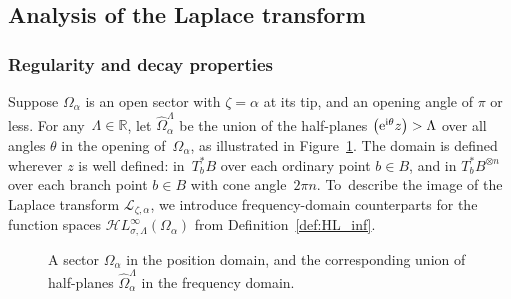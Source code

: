 \documentclass[10pt,a4paper]{amsart}
\let\Re\relax
\DeclareMathOperator{\Re}{Re}
\newcommand{\singexp}[2]{\mathcal{H}L^\infty_{#1, #2}}
\newcommand{\R}{\mathbb{R}}
\newcommand{\laplace}{\mathcal{L}}
\numberwithin{equation}{section}
\newcommand{\setfiberscale}[1]{
  \pgfmathsetmacro{\rfiber}{#1}
  \pgfmathsetmacro{\rshade}{1.5*\rfiber}
}
\newcommand{\drawfiber}{
  \foreach \sgn in {-1, 1} {
    \calligraphy[scale=\sgn, copperplate, heavy, heavy line width=0.25mm]
      (\rfiber, \rfiber) -- (\rfiber, -\rfiber)
      (\rfiber, -\rfiber) -- (-\rfiber, -\rfiber);
  }%
}
\newcommand{\fiberdescender}[1]{
  \calligraphy[copperplate, light, thin] (0, -\rfiber) -- (0, -#1);
}
\newcommand{\fibershading}[2]{
  \tikzmath{
    \shadestart = (-90 - #1) / \fiberdeg;
    \shadeend = (90 - #1) / \fiberdeg;
  }
  \fill[pwbeige!30, draw=pwbeige!60] (0, 0) ++(-#1:#2) -- ++(\shadestart:\rshade) arc (\shadestart:\shadeend:\rshade) -- cycle;
}
\newenvironment{fiber}[1][]{%
  \pgfkeys{/laplace/.cd, drop=0, shade=false, degree=1, phase=0, dis=0, #1}
  \begin{scope}
    \fill[surf] (-\rfiber, -\rfiber) rectangle (\rfiber, \rfiber);
    \clip (-\rfiber, -\rfiber) rectangle (\rfiber, \rfiber);
    \tikzmath{
      if \fibershade then {
        print \fibershading{\fiberphase}{\fiberdis};
      };
    }
}{%
  \end{scope}
  \tikzmath{
    if \fiberdrop > 0 then {
      print \fiberdescender{\fiberdrop};
    };
  }
  \drawfiber
}
\newcommand{\genfibercontent}[1][]{
  \pgfkeys{/laplace/.cd, dual=false, #1}
  \pgfmathsetmacro{\hatch}{\rfiber/8}%
  \pgfmathsetmacro{\firsthatch}{-\rfiber+\hatch}
  \pgfmathsetmacro{\nexthatch}{-\rfiber+2*\hatch}
  \pgfmathsetmacro{\hatchstop}{\rfiber-\hatch/2}
  \foreach \y in {\firsthatch, \nexthatch, ..., \hatchstop} {
    \tikzmath{
      coordinate \drawfrom;
      coordinate \drawto;
      if \fiberdual then {
        \drawfrom = (\y, -\rfiber);
        \drawto = (\y, \rfiber);
      } else {
        \drawfrom = (-\rfiber, \y);
        \drawto = (\rfiber, \y);
      };
    }
    \draw[leaf] (\drawfrom) -- (\drawto);
  }%
  \fill circle (\dotsize);
}
\begin{document}
\subsection{Analysis of the Laplace transform}\label{sec:laplace_analytic}
%
\subsubsection{Regularity and decay properties}\label{sec:reg-decay}
%
Suppose $\Omega_\alpha$ is an open sector with $\zeta = \alpha$ at its tip, and an opening angle of $\pi$ or less. For any~${\Lambda \in \R}$, let $\widehat{\Omega}_\alpha^\Lambda$ be the union of the half-planes $\Re\bigl({\rm e}^{{\rm i}\theta} z\bigr) > \Lambda$ over all angles $\theta$ in the opening of~$\Omega_\alpha$, as illustrated in Figure~\ref{fig:sectorial_domain-pos-fre}. The domain \smash{$\widehat{\Omega}_\alpha^\Lambda$} is defined wherever $z$ is well defined: in~$T_b^*B$ over each ordinary point $b \in B$, and in $T_b^*B^{\otimes n}$ over each branch point $b \in B$ with cone angle~$2\pi n$.
To~describe the image of the Laplace transform $\laplace_{\zeta,\alpha}$, we introduce frequency-domain counterparts for the function spaces $\singexp{\sigma}{\Lambda}(\Omega_\alpha)$ from Definition~\ref{def:HL_inf}.

\begin{figure}[!ht]\centering
{}
\caption{A sector $\Omega_\alpha$ in the position domain, and the corresponding union of half-planes $\widehat{\Omega}_\alpha^\Lambda$ in the frequency domain.}\label{fig:sectorial_domain-pos-fre}
\end{figure}
\end{document}
